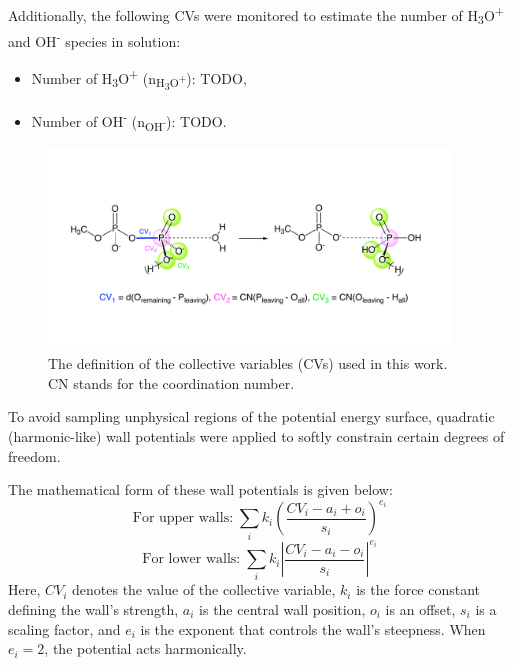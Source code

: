 Additionally, the following CVs were monitored to estimate the number of H\textsubscript{3}O\textsuperscript{+} and OH\textsuperscript{-} species in solution:
\begin{itemize}
    \item Number of H\textsubscript{3}O\textsuperscript{+} (n\textsubscript{H\textsubscript{3}O\textsuperscript{+}}): TODO,
    \item Number of OH\textsuperscript{-} (n\textsubscript{OH\textsuperscript{-}}): TODO.
\end{itemize}

\begin{figure}[t!]
    \centering
    \includegraphics[width=0.95\textwidth]{Figures/3_Computational_details/collective_variables.pdf}
    \caption{The definition of the collective variables (CVs) used in this work. CN stands for the coordination number.}
    \label{fig:collective_variables}
\end{figure}

To avoid sampling unphysical regions of the potential energy surface, quadratic (harmonic-like) wall potentials were applied to softly constrain certain degrees of freedom.

The mathematical form of these wall potentials is given below:
\begin{equation}
    \text{For upper walls:} \; \sum_i k_i \left( \frac{CV_i - a_i + o_i}{s_i} \right)^{e_i}
    \label{eq:upper_wall}
\end{equation}
\begin{equation}
    \text{For lower walls:} \; \sum_i k_i \left| \frac{CV_i - a_i - o_i}{s_i} \right|^{e_i}
    \label{eq:lower_wall}
\end{equation}
Here, $CV_i$ denotes the value of the collective variable, $k_i$ is the force constant defining the wall's strength, $a_i$ is the central wall position, $o_i$ is an offset, $s_i$ is a scaling factor, and $e_i$ is the exponent that controls the wall’s steepness. When $e_i = 2$, the potential acts harmonically.

